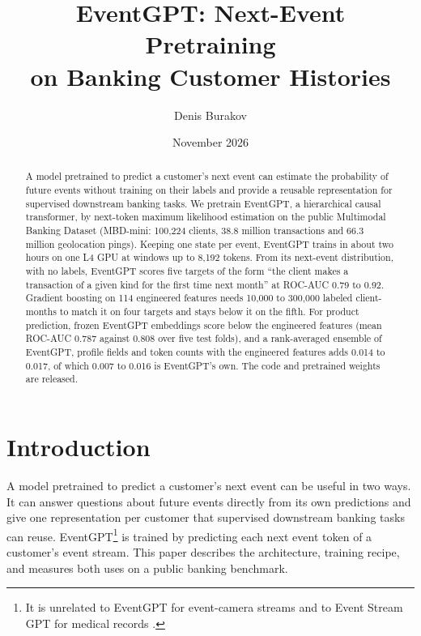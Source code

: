 \documentclass[12pt]{article}
\begin{document}
\onehalfspacing

\title{EventGPT: Next-Event Pretraining\\on Banking Customer Histories}
\author{Denis Burakov}
\date{November 2026}
\maketitle

\begin{abstract}
\noindent
A model pretrained to predict a customer's next event can estimate the probability of future events without training on their labels and provide a reusable representation for supervised downstream banking tasks. We pretrain EventGPT, a hierarchical causal transformer, by next-token maximum likelihood estimation on the public Multimodal Banking Dataset (MBD-mini: 100,224 clients, 38.8 million transactions and 66.3 million geolocation pings). Keeping one state per event, EventGPT trains in about two hours on one L4 GPU at windows up to 8,192 tokens. From its next-event distribution, with no labels, EventGPT scores five targets of the form ``the client makes a transaction of a given kind for the first time next month'' at ROC-AUC 0.79 to 0.92. Gradient boosting on 114 engineered features needs 10,000 to 300,000 labeled client-months to match it on four targets and stays below it on the fifth. For product prediction, frozen EventGPT embeddings score below the engineered features (mean ROC-AUC 0.787 against 0.808 over five test folds), and a rank-averaged ensemble of EventGPT, profile fields and token counts with the engineered features adds 0.014 to 0.017, of which 0.007 to 0.016 is EventGPT's own. The code and pretrained weights are released.
\end{abstract}

\section{Introduction}\label{sec:intro}

A model pretrained to predict a customer's next event can be useful in two ways. It can answer questions about future events directly from its own predictions and give one representation per customer that supervised downstream banking tasks can reuse. EventGPT\footnote{It is unrelated to EventGPT for event-camera streams \cite{eventgptcam} and to Event Stream GPT for medical records \cite{esgpt}.} is trained by predicting each next event token of a customer's event stream. This paper describes the architecture, training recipe, and measures both uses on a public banking benchmark.
\end{document}
